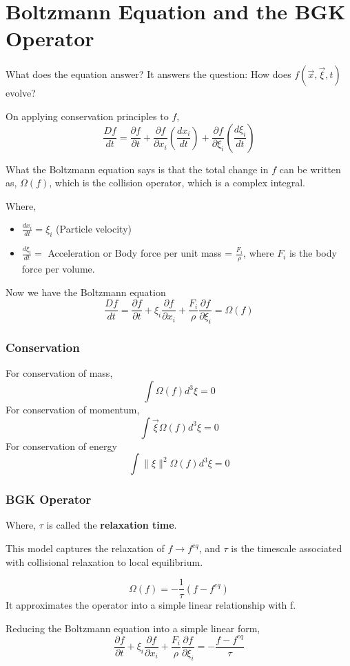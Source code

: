\documentclass{beamer}
\begin{document}
\section{Boltzmann Equation and the BGK Operator}
\begin{frame}
	What does the equation answer?
	\pause
	\linebreak
	It answers the question: How does $f(\vec{x},\vec{\xi},t)$ evolve?
\end{frame}
\begin{frame}
	On applying conservation principles to $f$,
\[
	\frac{Df}{dt} = \frac{\partial f}{\partial t} + \frac{\partial f}{\partial x_i}(\frac{d x_i}{dt}) + \frac{\partial f}{\partial \xi_i}(\frac{d \xi_i}{dt})
\]
\end{frame}
\begin{frame}
	What the Boltzmann equation says is that the total change in $f$ can be written as, $\Omega(f)$, which is the collision operator, which is a complex integral.
\end{frame}

\begin{frame}
Where, 
\begin{itemize}
	\item<1-> $\frac{dx_i}{dt} = \xi_i$ (Particle velocity)
	\item<2-> $\frac{d \xi_i}{dt} =$ Acceleration or Body force per unit mass = $\frac{F_i}{\rho}$, where $F_i$ is the body force per volume.
\end{itemize}
\end{frame}
\begin{frame}
	Now we have the Boltzmann equation
\[
	\frac{Df}{dt} = \frac{\partial f}{\partial t} + \xi_i \frac{\partial f}{\partial x_i} + \frac{F_i}{\rho} \frac{\partial f}{\partial \xi_i} = \Omega(f)
\]
\end{frame}
\begin{frame}
	\frametitle{Conservation}
For conservation of mass,
\[ 
	\int \Omega(f) d^3 \xi = 0
\]
\pause
For conservation of momentum,
\[ 
\int \vec{\xi} \Omega(f) d^3 \xi = 0
\]
\pause
For conservation of energy
\[
	\int \| \xi \|^2 \Omega(f) d^3 \xi = 0
\]
\end{frame}
\begin{frame}
\frametitle{BGK Operator}
Where, $\tau$ is called the \textbf{relaxation time}. 

This model captures the relaxation of $f \rightarrow f^{eq}$, and $\tau$ is the timescale associated with collisional relaxation to local equilibrium.

\[ 
	\Omega(f) = - \frac{1}{\tau} (f - f^{eq})
\]
It approximates the operator into a simple linear relationship with f.
\end{frame}
\begin{frame}
	\transdissolve
	Reducing the Boltzmann equation into a simple linear form,
\[
	\frac{\partial f}{\partial t} + \xi_i \frac{\partial f}{\partial x_i} + \frac{F_i}{\rho} \frac{\partial f}{\partial \xi_i} = -\frac{f - f^{eq}}{\tau}
\]
\end{frame}
\end{document}
